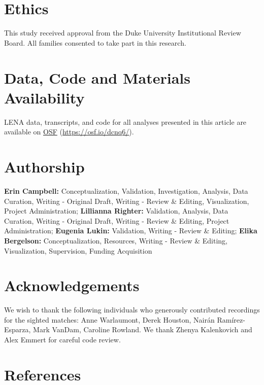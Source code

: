 \documentclass[
  man,floatsintext]{apa6}
\begin{document}
\hypertarget{ethics}{%
\section{Ethics}\label{ethics}}

This study received approval from the Duke University Institutional Review Board. All families consented to take part in this research.

\hypertarget{data-code-and-materials-availability}{%
\section{Data, Code and Materials Availability}\label{data-code-and-materials-availability}}

LENA data, transcripts, and code for all analyses presented in this article are available on \href{https://osf.io/dcnq6/}{OSF} (\url{https://osf.io/dcnq6/}).

\hypertarget{authorship}{%
\section{Authorship}\label{authorship}}

\textbf{Erin Campbell:} Conceptualization, Validation, Investigation, Analysis, Data Curation, Writing - Original Draft, Writing - Review \& Editing, Visualization, Project Administration; \textbf{Lillianna Righter:} Validation, Analysis, Data Curation, Writing - Original Draft, Writing - Review \& Editing, Project Administration; \textbf{Eugenia Lukin:} Validation, Writing - Review \& Editing; \textbf{Elika Bergelson:} Conceptualization, Resources, Writing - Review \& Editing, Visualization, Supervision, Funding Acquisition

\hypertarget{acknowledgements}{%
\section{Acknowledgements}\label{acknowledgements}}

We wish to thank the following individuals who generously contributed recordings for the sighted matches: Anne Warlaumont, Derek Houston, Nairán Ramírez-Esparza, Mark VanDam, Caroline Rowland. We thank Zhenya Kalenkovich and Alex Emmert for careful code review.

\hypertarget{references}{%
\section*{References}\label{references}}
\end{document}
